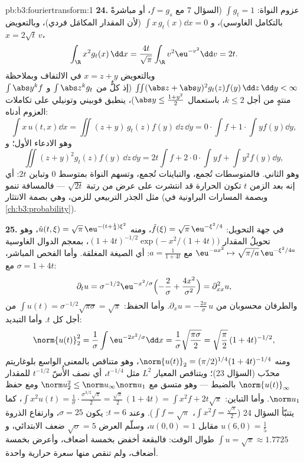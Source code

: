 \begin{solution}{pb:b3:fouriertransform:1}
\textbf{24.} عزوم النواة: $\int g_t = 1$ (السؤال 7 مع
$f = g_s$، أو مباشرةً بالتكامل الغاوسي)، و $\int
x\,g_t(x)\dd x = 0$ (لأن المقدار
المكامَل فردي)، وبالتعويض $x =
2\sqrt t\,v$،
\[
\int_\R x^2g_t(x)\,\dd x
= \frac{4t}{\sqrt\pi}\int_\R v^2\eu^{-v^2}\dd v = 2t .
\]
وبالتعويض $x = z + y$ في الالتفاف وبملاحظة
$\iint(\abs z + \abs y)^2g_t(z)f(y)\,\dd z\,\dd y < \infty$
(إذ كلٌّ من $\int\abs z^kg_t$ و $\int\abs y^kf$ منتهٍ من أجل $k
\leq 2$،
باستعمال $\abs y \leq \frac{1 + y^2}2$)، ينطبق فوبيني وتونيلي على تكاملات العزوم
أدناه:
\[
\int x\,u(t,x)\dd x = \iint (z + y)\,g_t(z)f(y)\,\dd z\,\dd
y = 0\cdot\!\int\! f + 1\cdot\!\int\! yf(y)\dd y,
\]
وهو الادعاء الأول؛ و
\[
\iint (z+y)^2g_t(z)f(y)\,\dd z\,\dd y
= 2t\int f + 2\cdot0\cdot\!\int\! yf + \int y^2f(y)\dd y ,
\]
وهو الثاني. فالمتوسطات تُجمع، والتباينات تُجمع، وتسهم النواة
بمتوسط $0$ وتباين $2t$: أي إنه بعد الزمن $t$ تكون الحرارة قد
انتشرت على عرض من رتبة $\sqrt{2t}$ --- فالمسافة تنمو مثل الجذر
التربيعي للزمن، وهي بصمة الانتثار (وبصمة المسارات البراونية في
\cref{ch:b3:probability}).

\textbf{25.} في جهة التحويل: $\hat f(\xi) =
\sqrt\pi\,\eu^{-\xi^2/4}$، ومنه $\hat u(t,\xi) =
\sqrt\pi\,\eu^{-(t + \frac14)\xi^2}$، وهو تحويلُ المقدار
$(1 + 4t)^{-1/2}\exp\bigl(-x^2/(1+4t)\bigr)$،
بمعجم الدوال الغاوسية
$\eu^{-ax^2} \mapsto
\sqrt{\pi/a}\,\eu^{-\xi^2/4a}$
مع $a = \frac1{1+4t}$: أي الصيغة
المغلقة. وأما الفحص المباشر، مع $\sigma = 1 + 4t$:
\[
\partial_tu = \sigma^{-1/2}\eu^{-x^2/\sigma}
\Bigl(-\frac2\sigma + \frac{4x^2}{\sigma^2}\Bigr)
= \partial^2_{xx}u ,
\]
والطرفان محسوبان من $\partial_xu =
-\frac{2x}\sigma\,u$. وأما الحفظ: $\int u(t) =
\sigma^{-1/2}\sqrt{\pi\sigma} = \sqrt\pi$ من أجل كل $t$.
وأما التبديد:
\[
\norm{u(t)}_2^2 = \frac1\sigma\int\eu^{-2x^2/\sigma}\dd x
= \frac1\sigma\sqrt{\frac{\pi\sigma}2}
= \sqrt{\frac\pi2}\,(1+4t)^{-1/2},
\]
ومنه $\norm{u(t)}_2 = (\pi/2)^{1/4}(1+4t)^{-1/4}$، وهو متناقص بالمعنى الواسع بلوغاريتم محدّب
(السؤال 23)؛ ويتناقص المعيار $L^2$ مثل $t^{-1/4}$، أي نصف
الأُسّ $t^{-1/2}$ للمقدار $\norm{u(t)}_\infty$ بالضبط --- وهو متسق مع $\norm u_2^2 \leq \norm u_\infty\norm u_1$
ومع حفظ $\norm u_1$. وأما التباين: $\int x^2u(t) =
\frac1\sigma\cdot\frac{\sigma^{3/2}\sqrt\pi}2 =
\frac{\sqrt\pi}2\,(1 + 4t) = \int x^2f + 2t\sqrt\pi$، كما يتنبّأ
السؤال 24 ($\int x^2f = \frac{\sqrt\pi}2$، $\int
f = \sqrt\pi$). وعند $t = 6$: يكون $\sigma = 25$،
وارتفاع الذروة $u(6, 0) = \frac15$ مقابل $u(0,0) = 1$، وسلّم العرض $\sqrt\sigma = 5$
ضعف الابتدائي، و $\int u =
\sqrt\pi \approx 1.7725$ طوال الوقت: فالبقعة أخفض بخمسة أضعاف،
وأعرض بخمسة أضعاف، ولم تنقص منها سعرة حرارية واحدة.
\end{solution}
